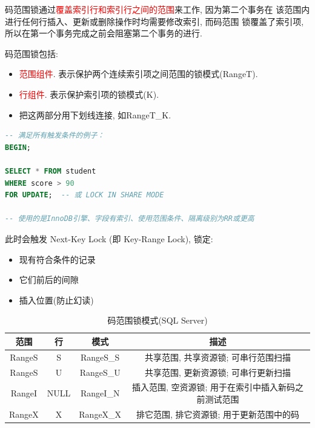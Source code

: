 码范围锁通过\textcolor{red}{覆盖索引行和索引行之间的范围}来工作, 因为第二个事务在
该范围内进行任何行插入、更新或删除操作时均需要修改索引, 而码范围
锁覆盖了索引项, 所以在第一个事务完成之前会阻塞第二个事务的进行.

码范围锁包括:
\begin{itemize}
  \item \textcolor{red}{范围组件}. 表示保护两个连续索引项之间范围的锁模式(RangeT).
  \item \textcolor{red}{行组件}. 表示保护索引项的锁模式(K).
  \item 把这两部分用下划线连接, 如RangeT\_K.
\end{itemize}

\begin{lstlisting}[language=SQL, caption={码范围锁典型触发示例}]
-- 满足所有触发条件的例子：
BEGIN;

SELECT * FROM student 
WHERE score > 90 
FOR UPDATE;  -- 或 LOCK IN SHARE MODE

-- 使用的是InnoDB引擎、字段有索引、使用范围条件、隔离级别为RR或更高
\end{lstlisting}

此时会触发 Next-Key Lock (即 Key-Range Lock), 锁定:
\begin{itemize}
  \item 现有符合条件的记录
  \item 它们前后的间隙
  \item 插入位置(防止幻读)
\end{itemize}


\begin{table}[H]
\centering
\begin{tabular}{|c|c|c|c|}
  \hline
\textbf{范围} & \textbf{行} & \textbf{模式} & \textbf{描述} \\
\hline
RangeS & S & RangeS\_S & 共享范围, 共享资源锁; 可串行范围扫描 \\
\hline
RangeS & U & RangeS\_U & 共享范围, 更新资源锁; 可串行更新扫描 \\
\hline
RangeI & NULL & RangeI\_N & 插入范围, 空资源锁; 用于在索引中插入新码之前测试范围 \\
\hline
RangeX & X & RangeX\_X & 排它范围, 排它资源锁; 用于更新范围中的码 \\
\hline
\end{tabular}
\caption{码范围锁模式(SQL Server)}
\end{table}




